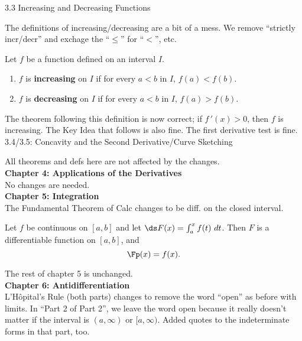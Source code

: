 \documentclass{article}
\newcounter{chapter}
\begin{document}
3.3 Increasing and Decreasing Functions

The definitions of increasing/decreasing are a bit of a mess. We remove ``strictly incr/decr'' and exchage the ``$\leq$'' for ``$<$'', etc.

{Let $f$ be a function defined on an interval $I$.
\begin{enumerate}
\item		$f$ is \textbf{increasing} on $I$ if for every $a<b$ in $I$, $f(a) < f(b)$.
\item		$f$ is \textbf{decreasing} on $I$ if for every $a<b$ in $I$, $f(a) > f(b)$.
\end{enumerate}
}

The theorem following this definition is now correct; if $f\,'(x) > 0$, then $f$ is increasing. The Key Idea that follows is also fine. The first derivative test is fine.\\

3.4/3.5: Concavity and the Second Derivative/Curve Sketching

All theorems and defs here are not affected by the changes.\\

\noindent\large\textbf{Chapter 4: Applications of the Derivatives}\normalsize\\

No changes are needed. \\

\noindent\large\textbf{Chapter 5: Integration}\normalsize\\

The Fundamental Theorem of Calc changes to be diff. on the closed interval.

{Let $f$ be continuous on $[a,b]$ and let $\ds F(x) = \int_a^x f(t)\ dt$. Then $F$ is a differentiable function on $[a,b]$, and $$\Fp(x)=f(x).$$
}

The rest of chapter 5 is unchanged.\\

\noindent\large\textbf{Chapter 6: Antidifferentiation}\normalsize\\

L'H\^opital's Rule (both parts) changes to remove the word ``open'' as before with limits. In ``Part 2 of Part 2'', we leave the word open because it really doesn't matter if the interval is $(a,\infty)$ or $[a,\infty)$. Added quotes to the indeterminate forms in that part, too.
\end{document}
